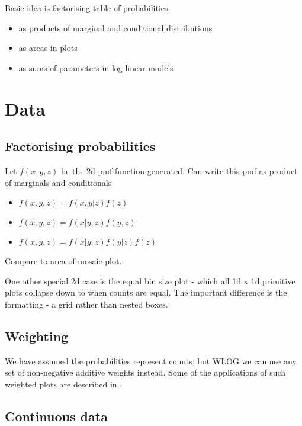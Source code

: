 \documentclass[letterpaper,oneside]{scrartcl}
\begin{document}
Basic idea is factorising table of probabilities:

\begin{itemize}
  \item as products of marginal and conditional distributions
  \item as areas in plots
  \item as sums of parameters in log-linear models
\end{itemize}


\section{Data}
\label{sec:data}

\subsection{Factorising probabilities}

Let $f(x, y, z)$ be the 2d pmf function generated.  Can write this pmf as product of marginals and conditionals

\begin{itemize}
  \item $f(x, y, z) = f(x, y | z) f(z)$
  \item $f(x, y, z) = f(x | y, z) f(y, z)$
  \item $f(x, y, z) = f(x | y, z) f(y | z) f(z)$
\end{itemize}

Compare to area of mosaic plot.

One other special 2d case is the equal bin size plot - which all 1d x 1d primitive plots collapse down to when counts are equal.  The important difference is the formatting - a grid rather than nested boxes.

\subsection{Weighting}
\label{sub:weighting}

We have assumed the probabilities represent counts, but WLOG we can use any set of non-negative additive weights instead.  Some of the applications of such weighted plots are described in \citet{unwin:2007}.

\subsection{Continuous data}
\label{sub:continuous_data}
\end{document}
